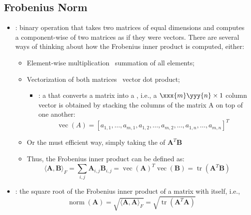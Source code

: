 \begin{itemize}
  \subsection{Frobenius Norm}\label{Frobenius Norm}
  \begin{itemize}
    \item {} : binary operation that takes two matrices of equal dimensions and computes a component-wise \hyperref[The Dot Product]{} of two matrices as if they were vectors. There are several ways of thinking about how the Frobenius inner product is computed, either:
      \begin{itemize}
        \item Element-wise multiplication \to~summation of all elements;
        \item Vectorization of both matrices \to~vector dot product;
          \begin{itemize}
            \item {}: a \hyperref[tbd]{} that converts a matrix into a , i.e., a \(\xxx{m}\yyy{n} \times 1\) column vector is obtained by stacking the columns of the matrix A on top of one another: 
            \[%
            \operatorname{vec}(A)=[a_{1,1},\ldots ,a_{m,1},a_{1,2},\ldots ,a_{m,2},\ldots ,a_{1,n},\ldots ,a_{m,n}]^T
            \]%
          \end{itemize}
        \item Or the must efficient way, simply taking the \hyperref[Diagonal and Trace]{} of \(\bm{A}^T \bm{B}\)
        \item Thus, the Frobenius inner product can be defined as:
        \[%
        \langle\bm{A}, \bm{B} \rangle_F =
        \sum_{i,j}\bm{A}_{i,j}\bm{B}_{i,j} = 
        \operatorname{vec}(\bm{A})^T\operatorname{vec}(\bm{B})=
        \operatorname{tr}(\bm{A}^T\bm{B})
        \]%
      \end{itemize}
    \item {}: the square root of the Frobenius inner product of a matrix with itself, i.e.,
    \[%
    \operatorname{norm}(\bm{A}) = \sqrt{\langle\bm{A}, \bm{A} \rangle_F} = \sqrt{\operatorname{tr}(\bm{A}^T \bm{A})}
\]
\end{itemize}
\end{itemize}
